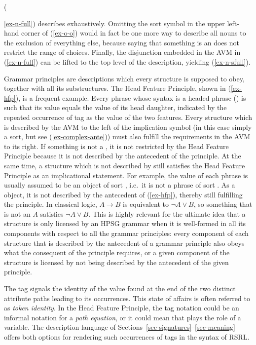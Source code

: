 \documentclass[output=paper
 	        ,biblatex
                ,babelshorthands
                ,newtxmath
                ,draftmode
                ,colorlinks, citecolor=brown
]{langscibook}
\begin{document}
({\ref{ex-n-full}) describes exhaustively. Omitting the sort
  symbol  in the upper left-hand corner of (\ref{ex-o-o})
  would in fact be one more way to describe all nouns to the exclusion of
  everything else,
  because saying that something is an  does not restrict
  the range of choices. Finally, the disjunction
  embedded in the AVM in (\ref{ex-n-full}) can be lifted to
the top level of the description, yielding (\ref{ex-n-sfull}).


Grammar principles are descriptions which every structure is supposed
to obey, together with all its substructures. The Head Feature
Principle, shown in (\ref{ex-hfp}), is a frequent example. Every
phrase whose syntax is a headed phrase () is such that its
 value equals the  value of its head
daughter, indicated by the repeated occurrence of tag  as the
value of the two  features.  Every structure which is
described by the AVM to the left of the implication symbol (in this
case simply a sort, but see (\ref{ex-complex-ante})) must also
fulfill the requirements in the AVM to its right. If something is not
a , it is
not restricted by the Head Feature Principle because it is not described by the
antecedent of the principle. At the same time, a structure which
is not described by  still satisfies
the Head Feature Principle as an implicational statement. For example,
the  value of each phrase is usually assumed to be an
object of sort , i.e.\ it is not a phrase of sort
. As a
 object, it is not described by the antecedent of
(\ref{ex-hfp}), thereby still fulfilling the principle. In classical
logic, $A \rightarrow B$ is equivalent to $\neg A \vee B$, so something
that is not an $A$ satisfies $\neg A \vee B$. This is highly relevant for the
ultimate idea that a structure is only licensed by an HPSG grammar when
it is well-formed in all its components with respect to all the grammar
principles: every component of each structure that
is described by the antecedent of a grammar principle also obeys what
the consequent of the principle requires, or a given component of the
structure is licensed by not being described by the antecedent of the
given principle.

The tag  signals the identity of the value found at the end of
the two distinct attribute paths leading to its occurrences. This state
of affairs is often referred to as \emph{token identity}. In
the Head Feature Principle, the tag notation
could be an informal notation for a \emph{path equation}, or it could mean
that  plays the role of a variable. The description language of
Sections~\ref{sec-signatures}--\ref{sec-meaning} offers both options for
rendering such occurrences of tags in the syntax of RSRL.

}
\end{document}
